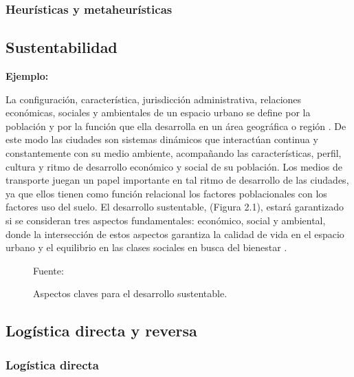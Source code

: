 \subsubsection{Heurísticas y metaheurísticas}

\subsection{Sustentabilidad}

{\bf Ejemplo:}\par

La configuración, característica, jurisdicción administrativa, relaciones económicas, sociales y ambientales de un espacio urbano se define por la población y por la función que ella desarrolla en un área geográfica o región \citep{Bugliarello}. De este modo las ciudades son sistemas dinámicos que interactúan continua y constantemente con su medio ambiente, acompañando las características, perfil, cultura y ritmo de desarrollo económico y social de su población. Los medios de transporte juegan un papel importante en tal ritmo de desarrollo de las ciudades, ya que ellos tienen como función relacional los factores poblacionales con los factores uso del suelo.  
\vskip 1cm
El desarrollo sustentable, (Figura 2.1), estará garantizado si se consideran tres aspectos fundamentales: económico, social y ambiental, donde la intersección de estos aspectos garantiza la calidad de vida en el espacio urbano y el equilibrio en las clases sociales en busca del bienestar \citep{Tanguay}.

\begin{figure}[ht]
\begin{center}
\end{center}
\begin{center}
\vskip -0.5cm
\caption{\small{Aspectos claves para el desarrollo sustentable.}}
{\small{Fuente: \cite{Tanguay}}}
\end{center}
\end{figure}

\subsection{Logística directa y reversa}

\subsubsection{Logística directa}

